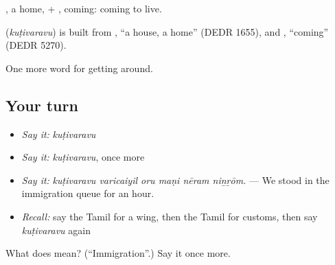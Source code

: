 , a home, + , coming: coming to live.

\begin{cousinweb}
\textbf{} (\emph{kuṭivaravu}) is built from , \textquotedblleft{}a house, a home\textquotedblright{} (DEDR 1655), and , \textquotedblleft{}coming\textquotedblright{} (DEDR 5270).
\end{cousinweb}

\begin{grammarlens}[title={What you've built}]
One more word for getting around.
\end{grammarlens}

\subsection*{Your turn}
\begin{itemize}
\raggedright
  \item \emph{Say it:} \emph{kuṭivaravu}
  \item \emph{Say it:} \emph{kuṭivaravu}, once more
  \item \emph{Say it:} \emph{kuṭivaravu varicaiyil oru maṇi nēram niṉṟōm.} — We stood in the immigration queue for an hour.
  \item \emph{Recall:} say the Tamil for a wing, then the Tamil for customs, then say \emph{kuṭivaravu} again
\end{itemize}

\begin{tcolorbox}[breakable,colback=teal!4,colframe=teal!35!black,title={Before you move on}]
What does  mean? (\textquotedblleft{}Immigration\textquotedblright{}.) Say it once more.
\end{tcolorbox}
